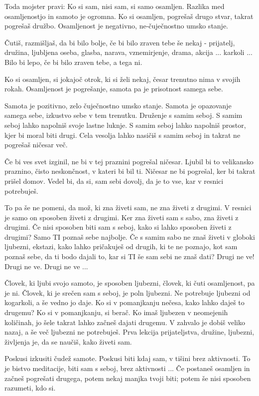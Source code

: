 Toda mojster pravi:  Ko si sam, nisi sam, si samo osamljen. Razlika med osamljenostjo in samoto je ogromna. Ko si osamljen, pogrešaš drugo stvar, takrat pogrešaš družbo. Osamljenost je negativno, ne-čuječnostno umsko stanje. 

Čutiš, razmišljaš, da bi bilo bolje, če bi bilo zraven tebe še nekaj - prijatelj, družina, ljubljena oseba, glasba, narava, vznemirjenje, drama, akcija ... karkoli ... Bilo bi lepo, če bi bilo zraven tebe, a tega ni. 

Ko si osamljen, si jokajoč otrok, ki si želi nekaj, česar trenutno nima v svojih rokah. Osamljenost je pogrešanje, samota pa je prisotnost samega sebe. 

Samota je pozitivno, zelo čuječnostno umsko stanje. Samota je opazovanje samega sebe, izkustvo sebe v tem trenutku. Druženje s samim seboj.  S samim seboj lahko napolniš svoje lastne luknje. S samim seboj lahko napolniš prostor, kjer bi moral biti drugi. Cela vesolja lahko nasičiš s samim seboj in takrat ne pogrešaš ničesar več. 

Če bi ves svet izginil, ne bi v tej praznini pogrešal ničesar.  Ljubil bi to velikansko praznino, čisto neskončnost, v kateri bi bil ti. Ničesar ne bi pogrešal, ker bi takrat prišel domov. Vedel bi, da si, sam sebi dovolj, da je to vse, kar v resnici potrebuješ. 

To pa še ne pomeni, da mož, ki zna živeti sam, ne zna živeti z drugimi. V resnici je samo on sposoben živeti z drugimi. Ker zna živeti sam s sabo, zna živeti z drugimi. Če nisi sposoben biti sam s seboj, kako si lahko sposoben živeti z drugimi? Samo TI poznaš sebe najbolje. Če s samim sabo ne znaš živeti v globoki ljubezni, ekstazi, kako lahko pričakuješ od drugih, ki te ne poznajo, kot sam poznaš sebe, da ti bodo dajali to, kar si TI še sam sebi ne znaš dati? Drugi ne ve! Drugi ne ve. Drugi ne ve ... 

Človek, ki ljubi svojo samoto, je sposoben ljubezni, človek, ki čuti osam\-ljenost, pa je ni. Človek, ki je srečen sam s seboj, je poln ljubezni. Ne potrebuje ljubezni od kogarkoli, a še vedno jo daje. Ko si v pomanjkanju nečesa, kako lahko daješ to drugemu? Ko si v pomanjkanju, si berač. Ko imaš ljubezen v neomejenih količinah, jo šele takrat lahko začneš dajati drugemu. V zahvalo je dobiš veliko nazaj, a še več ljubezni ne potrebuješ.  Prva lekcija prijateljstva, družine, ljubezni, življenja je, da se naučiš, kako živeti sam. 

Poskusi izkusiti čudež samote. Poskusi biti kdaj sam, v tišini brez aktivnosti. To je bistvo meditacije, biti sam s seboj, brez aktivnosti ... Če postaneš osamljen in začneš pogrešati drugega, potem nekaj manjka tvoji biti; potem še nisi sposoben razumeti, kdo si. 

